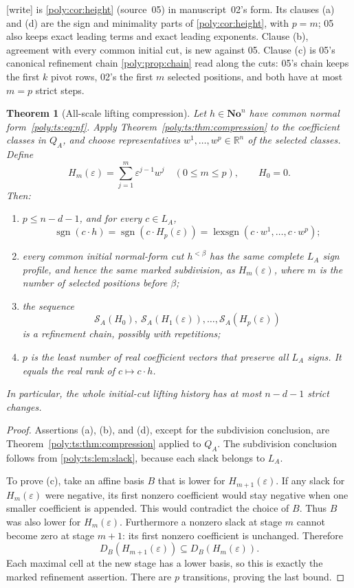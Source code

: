 \documentclass[11pt,a4paper]{article}
\numberwithin{equation}{section}
\newtheorem{theorem}{Theorem}[section]
\theoremstyle{plain}
\newcommand{\wtag}{\textup{[write]}}%
\newcommand{\No}{\mathbf{No}}
\newcommand{\R}{\mathbb R}
\newcommand{\eps}{\varepsilon}
\newcommand{\sgn}{\operatorname{sgn}}
\newcommand{\cS}{\mathcal S}
\newcommand{\lexsgn}{\operatorname{lexsgn}}
\begin{document}
\noindent\wtag{}  is \cref{poly:cor:height}
(source~05) in manuscript~02's form. Its clauses (a) and (d) are the sign
and minimality parts of \cref{poly:cor:height}, with $p=m$; 05 also keeps
exact leading terms and exact leading exponents. Clause (b), agreement with
every common initial cut, is new against 05. Clause (c) is 05's canonical
refinement chain \cref{poly:prop:chain} read along the cuts: 05's chain
keeps the first $k$ pivot rows, 02's the first $m$ selected positions, and
both have at most $m=p$ strict steps.
\begin{theorem}[All-scale lifting compression]\label{poly:ts:thm:heights}
Let $h\in\No^n$ have common normal form~\eqref{poly:ts:eq:nf}. Apply
Theorem~\ref{poly:ts:thm:compression} to the coefficient classes in $Q_A$, and
choose representatives $w^1,\ldots,w^p\in\R^n$ of the selected classes.
Define
\[
 H_m(\eps)=\sum_{j=1}^m\eps^{j-1}w^j\quad(0\le m\le p),
 \qquad H_0=0.
\]
Then:
\begin{enumerate}[label=(\alph*)]
\item $p\le n-d-1$, and for every $c\in L_A$,
\[
 \sgn(c\cdot h)=\sgn(c\cdot H_p(\eps))
 =\lexsgn(c\cdot w^1,\ldots,c\cdot w^p);
\]
\item every common initial normal-form cut $h^{<\beta}$ has the same
complete $L_A$ sign profile, and hence the same marked subdivision, as
$H_m(\eps)$, where $m$ is the number of selected positions before $\beta$;
\item the sequence
\[
 \cS_A(H_0),\ \cS_A(H_1(\eps)),\ldots,\cS_A(H_p(\eps))
\]
is a refinement chain, possibly with repetitions;
\item $p$ is the least number of real coefficient vectors that preserve
all $L_A$ signs. It equals the real rank of $c\mapsto c\cdot h$.
\end{enumerate}
In particular, the whole initial-cut lifting history has at most $n-d-1$
strict changes.
\end{theorem}
\begin{proof}
Assertions (a), (b), and (d), except for the subdivision conclusion, are
Theorem~\ref{poly:ts:thm:compression} applied to $Q_A$. The subdivision conclusion
follows from \cref{poly:ts:lem:slack}, because each slack belongs to $L_A$.

To prove (c), take an affine basis $B$ that is lower for $H_{m+1}(\eps)$.
If any slack for $H_m(\eps)$ were negative, its first nonzero coefficient
would stay negative when one smaller coefficient is appended. This would
contradict the choice of $B$. Thus $B$ was also lower for $H_m(\eps)$.
Furthermore a nonzero slack at stage $m$ cannot become zero at stage $m+1$:
its first nonzero coefficient is unchanged. Therefore
\[
 D_B(H_{m+1}(\eps))\subseteq D_B(H_m(\eps)).
\]
Each maximal cell at the new stage has a lower basis, so this is exactly
the marked refinement assertion. There are $p$ transitions, proving the
last bound.
\end{proof}
\end{document}
